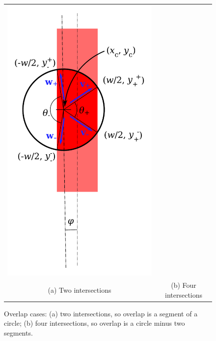 \documentclass[a4paper,11pt,article]{memoir}
\begin{document}
\begin{figure}
\begin{center}
\begin{tabular}{cc}
    \includegraphics[height=0.6\textheight]{overlap-4} \\
    (a) Two intersections & (b) Four intersections
    \end{tabular}
  \end{center}

  \caption{Overlap cases: (a) two intersections, so overlap is a
    segment of a circle; (b) four intersections, so overlap is a
    circle minus two segments.}\label{fig:overlaps}
\end{figure}
\end{document}
